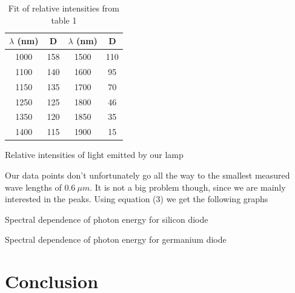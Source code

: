 \documentclass[a4paper,11pt]{article}
\begin{document}
\begin{table}[htpb]
    \begin{minipage}[b]{.45\linewidth}
        \centering
        \begin{tabular}{c c c c}
            $ \lambda $ (nm) & D & $ \lambda $ (nm) & D \\ 
            \hline\hline
            1000 & 158 & 1500 & 110 \\
            1100 & 140 & 1600 & 95 \\
            1150 & 135 & 1700 & 70 \\
            1250 & 125 & 1800 & 46 \\
            1350 & 120 & 1850 & 35 \\
            1400 & 115 & 1900 & 15 \\
        \end{tabular}
        \caption{Relative intensities of light emitted by our lamp}

    \end{minipage} 
    \hfill
    \begin{minipage}[b]{.49\linewidth}
        \centering
        \resizebox{\textwidth}{!}{  }
        \captionsetup{type=graph}
        \caption{Fit of relative intensities from table 1}
    \end{minipage} 
\end{table}

Our data points don't unfortunately go all the way to the smallest measured wave lengths of $ 0.6 \ \mu m $. It is not a big problem though, since we are mainly interested in the peaks. Using equation (3) we get the following graphs

\begin{table}[htpb]
    \begin{minipage}[b]{.45\linewidth}
        \centering
        \resizebox{\textwidth}{!}{  }
        \captionsetup{type=graph}
        \caption{Spectral dependence of photon energy for silicon diode }
    \end{minipage} 
    \hfill
    \begin{minipage}[b]{.45\linewidth}
        \centering
        \resizebox{\textwidth}{!}{  }
        \captionsetup{type=graph}
        \caption{Spectral dependence of photon energy for germanium diode }
    \end{minipage} 
\end{table}

\section{Conclusion}
\end{document}
